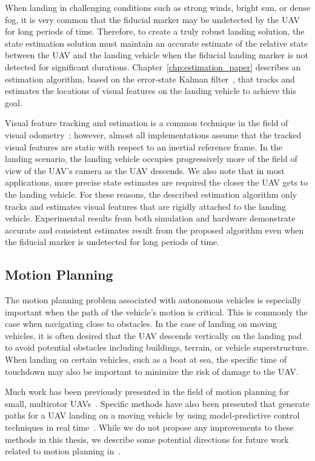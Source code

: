 When landing in challenging conditions such as strong winds, bright sun, or
dense fog, it is very common that the fiducial marker may be undetected by the UAV
for long periods of time. Therefore, to create a truly robust landing solution,
the state estimation solution must maintain an accurate estimate of the relative
state between the UAV and the landing vehicle when the fiducial landing marker
is not detected for significant durations. Chapter~\ref{chp:estimation_paper}
describes an estimation algorithm, based on the error-state Kalman
filter~\cite{roumeliotis1999circumventing}, that tracks and estimates the locations of
visual features on the landing vehicle to achieve this goal.

Visual feature
tracking and estimation is a common technique in the field of visual
odometry~\cite{qin2018vins}; however, almost all implementations assume that the
tracked visual features are static with respect to an inertial reference frame.
In the landing scenario, the landing vehicle occupies progressively more of the
field of view of the UAV's camera as the UAV descends. We also note that in most
applications, more precise state estimates are required the closer the UAV gets
to the landing vehicle. For these reasons, the described estimation algorithm
only tracks and estimates visual features that are rigidly attached to the landing vehicle.
Experimental results
from both simulation and hardware demonstrate accurate and consistent estimates
result from the proposed algorithm even when the fiducial marker is undetected
for long periods of time.

\subsection{Motion Planning}
The motion planning problem associated with autonomous vehicles is especially
important when the path of the vehicle's motion is critical.
This is commonly the case when
navigating close to obstacles. In the case of landing on moving vehicles, it is
often desired that the UAV descends vertically on the landing pad to avoid
potential obstacles including buildings, terrain, or vehicle superstructure.
When landing on certain vehicles, such as a boat at sea, the specific time of
touchdown may also be important to minimize the risk of damage to the UAV.

Much work has been previously presented in the field of motion planning for
small, multirotor UAVs~\cite{mellinger2011minimum}. Specific methods have also been 
presented that generate paths for a UAV landing on a moving
vehicle by using model-predictive control techniques in real time~\cite{baca2019autonomous}.
While we do not propose any improvements to these methods in this thesis, we
describe some potential directions for future work related to motion planning
in~.

